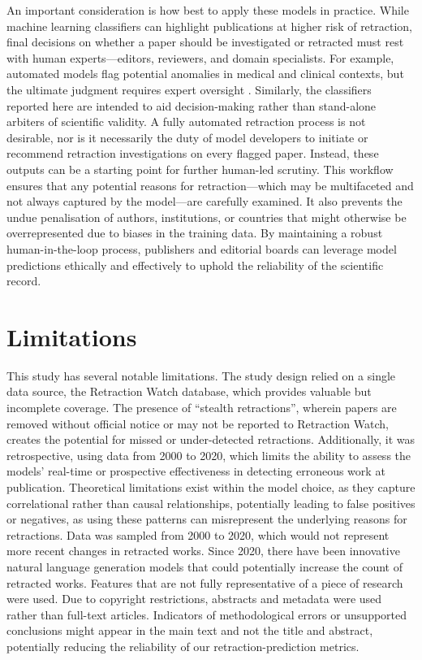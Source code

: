\documentclass[pdflatex,sn-mathphys-num]{sn-jnl}%
\begin{document}
An important consideration is how best to apply these models in practice. While machine learning classifiers can highlight publications at higher risk of retraction, final decisions on whether a paper should be investigated or retracted must rest with human experts—editors, reviewers, and domain specialists. For example, automated models flag potential anomalies in medical and clinical contexts, but the ultimate judgment requires expert oversight \cite{prictor_where_2023, funer_responsibility_2023}. Similarly, the classifiers reported here are intended to aid decision-making rather than stand-alone arbiters of scientific validity. A fully automated retraction process is not desirable, nor is it necessarily the duty of model developers to initiate or recommend retraction investigations on every flagged paper. Instead, these outputs can be a starting point for further human-led scrutiny. This workflow ensures that any potential reasons for retraction—which may be multifaceted and not always captured by the model—are carefully examined. It also prevents the undue penalisation of authors, institutions, or countries that might otherwise be overrepresented due to biases in the training data. By maintaining a robust human-in-the-loop process, publishers and editorial boards can leverage model predictions ethically and effectively to uphold the reliability of the scientific record.



\section{Limitations}

This study has several notable limitations. The study design relied on a single data source, the Retraction Watch database, which provides valuable but incomplete coverage. The presence of ``stealth retractions'', wherein papers are removed without official notice or may not be reported to Retraction Watch, creates the potential for missed or under-detected retractions. Additionally, it was retrospective, using data from 2000 to 2020, which limits the ability to assess the models' real-time or prospective effectiveness in detecting erroneous work at publication. Theoretical limitations exist within the model choice, as they capture correlational rather than causal relationships, potentially leading to false positives or negatives, as using these patterns can misrepresent the underlying reasons for retractions. Data was sampled from 2000 to 2020, which would not represent more recent changes in retracted works. Since 2020, there have been innovative natural language generation models that could potentially increase the count of retracted works. Features that are not fully representative of a piece of research were used. Due to copyright restrictions, abstracts and metadata were used rather than full-text articles. Indicators of methodological errors or unsupported conclusions might appear in the main text and not the title and abstract, potentially reducing the reliability of our retraction-prediction metrics.
\end{document}
